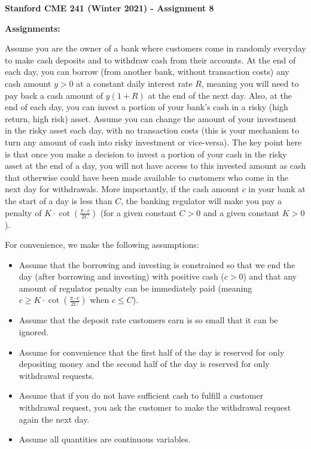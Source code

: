 \documentclass[12pt]{exam}
\begin{document}
\begin{center}
{\large {\bf Stanford CME 241 (Winter 2021) - Assignment 8}}
\end{center}
 
{\large{\bf Assignments:}}
\begin{questions}
\question Assume you are the owner of a bank where customers come in randomly everyday to make cash deposits and to withdraw cash from their accounts. At the end of each day, you can borrow (from another bank, without transaction costs) any cash amount $y > 0$ at a constant daily interest rate $R$, meaning you will need to pay back a cash amount of $y(1+R)$ at the end of the next day. Also, at the end of each day, you can invest a portion of your bank's cash in a risky (high return, high risk) asset. Assume you can change the amount of your investment in the risky asset each day, with no transaction costs (this is your mechanism to turn any amount of cash into risky investment or vice-versa). The key point here is that once you make a decision to invest a portion of your cash in the risky asset at the end of a day, you will not have access to this invested amount as cash that otherwise could have been made available to customers who come in the next day for withdrawals. More importantly, if the cash amount $c$ in your bank at the start of a day is less than $C$, the banking regulator will make you pay a penalty of $K \cdot \cot(\frac {\pi \cdot c}{2C})$ (for a given constant $C > 0$ and a given constant $K > 0$).

For convenience, we make the following assumptions:
\begin{itemize}
\item  Assume that the borrowing and investing is constrained so that we end the day (after borrowing and investing) with positive cash ($c >  0$) and that any amount of regulator penalty can be immediately paid (meaning $c \geq K \cdot \cot(\frac {\pi \cdot c}{2C})$ when $c \leq C$).
\item Assume that the deposit rate customers earn is so small that it can be ignored.
\item Assume for convenience that the first half of the day is reserved for only depositing money and the second half of the day is reserved for only withdrawal requests.
\item Assume that if you do not have sufficient cash to fulfill a customer withdrawal request, you ask the customer to make the withdrawal request again the next day.
\item Assume all quantities are continuous variables.
\end{itemize}


\end{questions}
\end{document}
